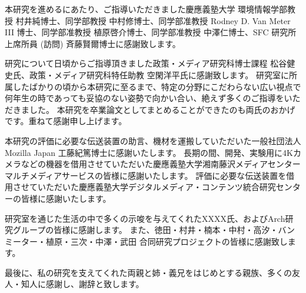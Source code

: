 \begin{acknowledgment}

本研究を進めるにあたり、ご指導いただきました慶應義塾大学 環境情報学部教授 村井純博士、同学部教授 中村修博士、同学部准教授 Rodney D. Van Meter III 博士、同学部准教授 植原啓介博士、同学部准教授 中澤仁博士、SFC 研究所 上席所員 (訪問) 斉藤賢爾博士に感謝致します。

研究について日頃からご指導頂きました政策・メディア研究科博士課程 松谷健史氏、政策・メディア研究科特任助教 空閑洋平氏に感謝致します。
研究室に所属したばかりの頃から本研究に至るまで、特定の分野にこだわらない広い視点で何年生の時であっても妥協のない姿勢で向かい合い、絶えず多くのご指導をいただきました。
本研究を卒業論文としてまとめることができたのも両氏のおかげです。重ねて感謝申し上げます。

本研究の評価に必要な伝送装置の助言、機材を運搬していただいた一般社団法人 Mozilla Japan 工藤紀篤博士に感謝いたします。
長期の間、開発、実験用に4Kカメラなどの機器を借用させていただいた慶應義塾大学湘南藤沢メディアセンター　マルチメディアサービスの皆様に感謝いたします。
評価に必要な伝送装置を借用させていただいた慶應義塾大学デジタルメディア・コンテンツ統合研究センターの皆様に感謝いたします。

研究室を通じた生活の中で多くの示唆を与えてくれたXXXX氏、およびArch研究グループの皆様に感謝します。
また、徳田・村井・楠本・中村・高汐・バンミーター・植原・三次・中澤・武田 合同研究プロジェクトの皆様に感謝致します。

最後に、私の研究を支えてくれた両親と姉・義兄をはじめとする親族、多くの友人・知人に感謝し、謝辞と致します。

\end{acknowledgment}
